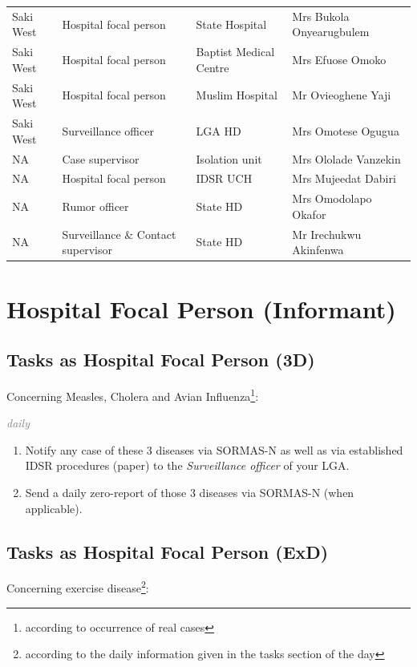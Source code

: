 \documentclass[a4paper, titlepage]{tufte-handout}
\begin{document}
\begin{table}
\begin{tabular}{l|l|l|l}
Saki West & Hospital focal person & State Hospital & Mrs Bukola Onyearugbulem\\
Saki West & Hospital focal person & Baptist Medical Centre & Mrs Efuose Omoko\\
Saki West & Hospital focal person & Muslim Hospital & Mr Ovieoghene Yaji\\
Saki West & Surveillance officer & LGA HD & Mrs Omotese Ogugua\\
NA & Case supervisor & Isolation unit & Mrs Ololade Vanzekin\\
NA & Hospital focal person & IDSR UCH & Mrs Mujeedat Dabiri\\
NA & Rumor officer & State HD & Mrs Omodolapo Okafor\\
NA & Surveillance \& Contact supervisor & State HD & Mr Irechukwu Akinfenwa\\
\bottomrule
\end{tabular}
\end{table}

\newpage
\section{Hospital Focal Person (Informant)}
\label{sec-2}

\subsection{Tasks as Hospital Focal Person (3D)}
\label{sec-2-1}

Concerning Measles, Cholera and Avian Influenza\footnote{according to occurrence of real cases}:

\emph{\textcolor{gray}{daily}}

\begin{enumerate}
\item Notify any case of these 3 diseases via SORMAS-N as well as via established IDSR procedures (paper) to the \emph{Surveillance officer} of your LGA.

\item Send a daily zero-report of those 3 diseases via SORMAS-N (when applicable).
\end{enumerate}

\subsection{Tasks as Hospital Focal Person (ExD)}
\label{sec-2-2}

Concerning exercise disease\footnote{according to the daily information given in the tasks section of the day}:
\end{document}
